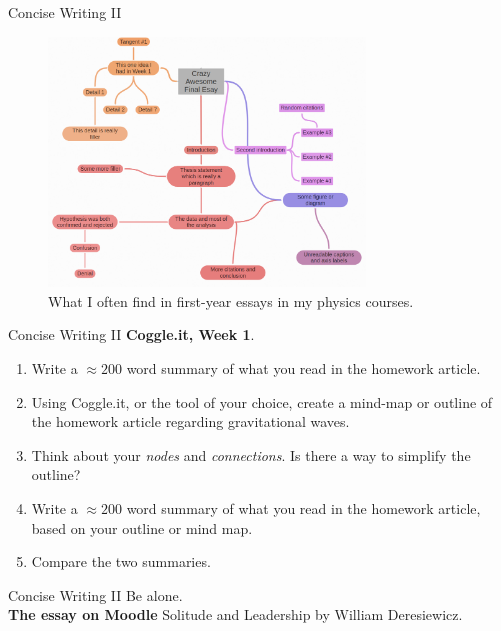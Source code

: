 \documentclass{beamer}
\begin{document}
\begin{frame}{Concise Writing II}
\begin{figure}
\centering
\includegraphics[width=0.75\textwidth]{figures/MindMap3.png}
\caption{\label{fig:mm3} What I often find in first-year essays in my physics courses.}
\end{figure}
\end{frame}

\begin{frame}{Concise Writing II}
\textbf{Coggle.it, Week 1}.
\begin{enumerate}
\item Write a $\approx 200$ word summary of what you read in the homework article.
\item Using Coggle.it, or the tool of your choice, create a mind-map or outline of the homework article regarding gravitational waves.
\item Think about your \textit{nodes} and \textit{connections}.  Is there a way to simplify the outline?
\item Write a $\approx 200$ word summary of what you read in the homework article, based on your outline or mind map.
\item Compare the two summaries.
\end{enumerate}
\end{frame}

\begin{frame}{Concise Writing II}
\small
Be alone. \\ \vspace{0.5cm}
\alert{\textbf{The essay on Moodle} Solitude and Leadership} by William Deresiewicz.
\end{frame}
\end{document}
